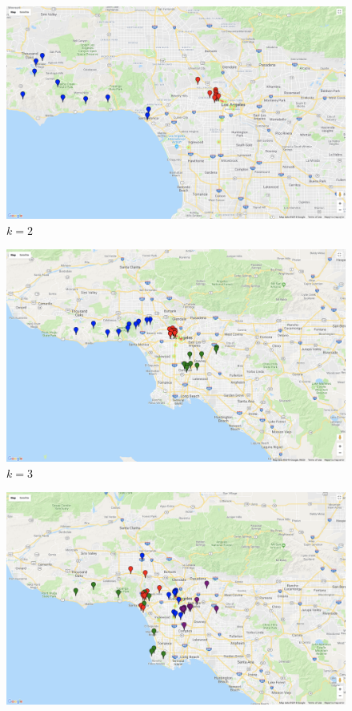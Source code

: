 \documentclass[11pt,letterpaper]{article}
\begin{document}
\begin{subfigures}
\begin{figure}[H]\centering
\includegraphics[width=\linewidth, height=0.4\textheight]{k=2.png}
\caption{$k=2$}
\end{figure}
%
\begin{figure}[H]\centering
\includegraphics[width=\linewidth, height=0.4\textheight]{k=3.png}
\caption{$k=3$}
\end{figure}
%
\begin{figure}[H]\centering
  \includegraphics[width=\linewidth, height=0.4\textheight]{k=4.png}

\end{figure}
\end{subfigures}
\end{document}
